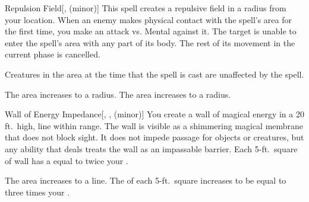 \lowercase{\hypertarget{spell:Repulsion Field}{}}\label{spell:Repulsion Field}
\begin{freeability}[Rank 3]{\hypertarget{spell:Repulsion Field}{Repulsion Field}}[,  (minor)]
This spell creates a repulsive field in a \areamed radius  from your location.
When an enemy makes physical contact with the spell's area for the first time, you make an attack vs. Mental against it.
\hit The target is unable to enter the spell's area with any part of its body.
The rest of its movement in the current phase is cancelled.

Creatures in the area at the time that the spell is cast are unaffected by the spell.

\rankline
{} The area increases to a \arealarge radius.
 The area increases to a \areahuge radius.
\end{freeability}
\vspace{0.25em}



\lowercase{\hypertarget{spell:Wall of Energy Impedance}{}}\label{spell:Wall of Energy Impedance}
\begin{freeability}[Rank 3]{\hypertarget{spell:Wall of Energy Impedance}{Wall of Energy Impedance}}[, ,  (minor)]
\targetrule
You create a wall of magical energy in a 20 ft.\ high, \areamed line within \rngmed range.
The wall is visible as a shimmering magical membrane that does not block sight.
It does not impede passage for objects or creatures, but any ability that deals  treats the wall as an impassable barrier.
Each 5-ft.\ square of wall has a  equal to twice your .

\rankline
{} The area increases to a \arealarge line.
 The  of each 5-ft.\ square increases to be equal to three times your .
\end{freeability}
\vspace{0.25em}




